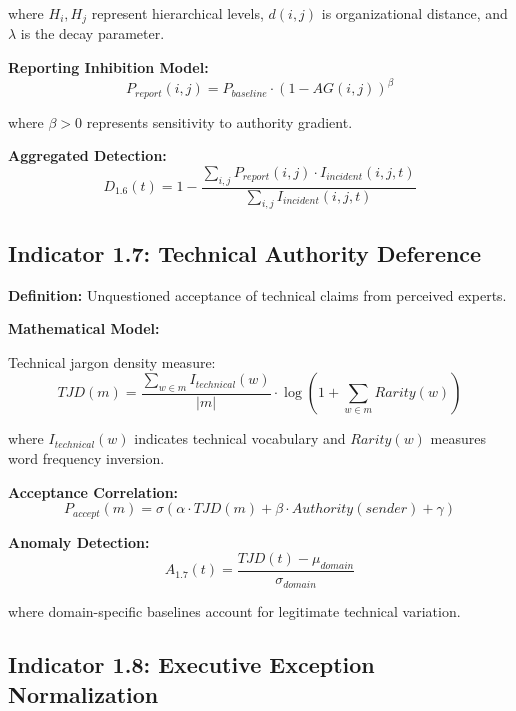 \documentclass[11pt,a4paper]{article}
\begin{document}
where $H_i, H_j$ represent hierarchical levels, $d(i,j)$ is organizational distance, and $\lambda$ is the decay parameter.

\textbf{Reporting Inhibition Model:}
\begin{equation}
P_{report}(i,j) = P_{baseline} \cdot (1 - AG(i,j))^{\beta}
\end{equation}

where $\beta > 0$ represents sensitivity to authority gradient.

\textbf{Aggregated Detection:}
\begin{equation}
D_{1.6}(t) = 1 - \frac{\sum_{i,j} P_{report}(i,j) \cdot I_{incident}(i,j,t)}{\sum_{i,j} I_{incident}(i,j,t)}
\end{equation}

\subsection{Indicator 1.7: Technical Authority Deference}

\textbf{Definition:} Unquestioned acceptance of technical claims from perceived experts.

\textbf{Mathematical Model:}

Technical jargon density measure:
\begin{equation}
TJD(m) = \frac{\sum_{w \in m} I_{technical}(w)}{|m|} \cdot \log\left(1 + \sum_{w \in m} Rarity(w)\right)
\end{equation}

where $I_{technical}(w)$ indicates technical vocabulary and $Rarity(w)$ measures word frequency inversion.

\textbf{Acceptance Correlation:}
\begin{equation}
P_{accept}(m) = \sigma(\alpha \cdot TJD(m) + \beta \cdot Authority(sender) + \gamma)
\end{equation}

\textbf{Anomaly Detection:}
\begin{equation}
A_{1.7}(t) = \frac{TJD(t) - \mu_{domain}}{\sigma_{domain}}
\end{equation}

where domain-specific baselines account for legitimate technical variation.

\subsection{Indicator 1.8: Executive Exception Normalization}
\end{document}
